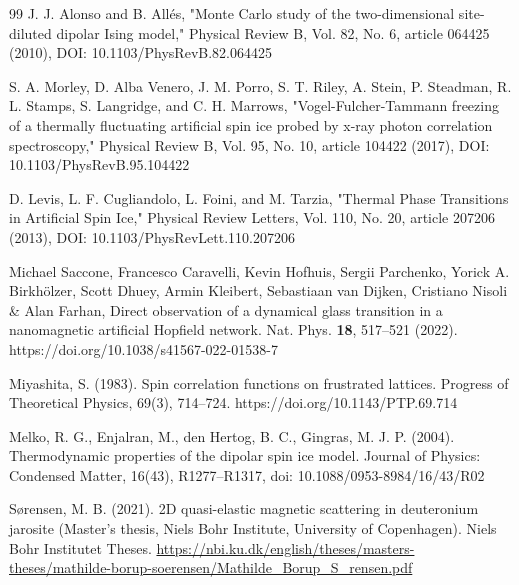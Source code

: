 \documentclass[
    aps,
    prb,
    reprint,           %
    superscriptaddress,%
    amsmath,amssymb,
    floatfix
]{revtex4-2}
\begin{document}
\begin{thebibliography}{99}
 J. J. Alonso and B. Allés, "Monte Carlo study of the two-dimensional site-diluted dipolar Ising model," Physical Review B, Vol. 82, No. 6, article 064425 (2010), DOI: 10.1103/PhysRevB.82.064425

 S. A. Morley, D. Alba Venero, J. M. Porro, S. T. Riley, A. Stein, P. Steadman, R. L. Stamps, S. Langridge, and C. H. Marrows, "Vogel-Fulcher-Tammann freezing of a thermally fluctuating artificial spin ice probed by x-ray photon correlation spectroscopy," Physical Review B, Vol. 95, No. 10, article 104422 (2017), DOI: 10.1103/PhysRevB.95.104422

D. Levis, L. F. Cugliandolo, L. Foini, and M. Tarzia, "Thermal Phase Transitions in Artificial Spin Ice," Physical Review Letters, Vol. 110, No. 20, article 207206 (2013), DOI: 10.1103/PhysRevLett.110.207206

Michael Saccone, Francesco Caravelli, Kevin Hofhuis, Sergii Parchenko, Yorick A. Birkhölzer, Scott Dhuey, Armin Kleibert, Sebastiaan van Dijken, Cristiano Nisoli \& Alan Farhan, Direct observation of a dynamical glass transition in a nanomagnetic artificial Hopfield network. Nat. Phys. \textbf{18}, 517–521 (2022). https://doi.org/10.1038/s41567-022-01538-7

 Miyashita, S. (1983). Spin correlation functions on frustrated lattices. Progress of Theoretical Physics, 69(3), 714–724. https://doi.org/10.1143/PTP.69.714

 Melko, R. G., Enjalran, M., den Hertog, B. C., Gingras, M. J. P. (2004). Thermodynamic properties of the dipolar spin ice model. Journal of Physics: Condensed Matter, 16(43), R1277–R1317, doi: 10.1088/0953-8984/16/43/R02

 S{\o}rensen, M. B. (2021). 2D quasi-elastic magnetic scattering in deuteronium jarosite (Master's thesis, Niels Bohr Institute, University of Copenhagen). Niels Bohr Institutet Theses. \url{ https://nbi.ku.dk/english/theses/masters-theses/mathilde-borup-soerensen/Mathilde_Borup_S_rensen.pdf}

\end{thebibliography}

% 
\end{document}
